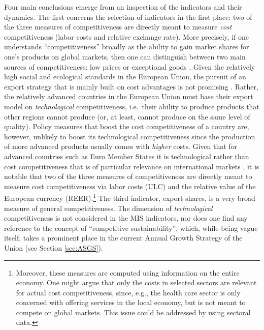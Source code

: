 \documentclass[
]{article}
\begin{document}
Four main conclusions emerge from an inspection of the indicators and their
dynamics.
The first concerns the selection of indicators in the first place:
two of the three measures of competitiveness are directly meant to measure
\emph{cost} competitiveness (labor costs and relative exchange rate).
More precisely, if one understands \enquote{competitiveness} broadly as the ability to
gain market shares for one's products on global markets,
then one can distinguish between two main sources of competitiveness:
low prices or exceptional goods
\citep[or, similarly, goods of exceptional quality, see][]{Sutton2012}.
Given the relatively high social and ecological standards in the European Union,
the pursuit of an export strategy that is mainly built on cost advantages is
not promising \citep[see also][]{Kapeller:2019cds}.
Rather, the relatively advanced countries in the European Union must base their
export model on \emph{technological} competitiveness, i.e.~their ability to produce
products that other regions cannot produce (or, at least, cannot produce on the
same level of quality).
Policy measures that boost the cost competitiveness of a country are, however,
unlikely to boost its technological competitiveness since the production of
more advanced products usually comes with \emph{higher} costs.
Given that for advanced countries such as Euro Member States it is
technological rather than cost competitiveness that is of particular relevance
on international markets \citep[e.g.][]{Carlin.2001, Storm.2015jsi, Dosi.2015},
it is notable that two of the three measures of competitiveness are directly
meant to measure cost competitiveness via labor costs (ULC) and the relative
value of the European currency (REER).\footnote{Moreover, these measures are computed using information on the entire
  economy. One might argue that only the costs in selected sectors are relevant
  for actual cost competitiveness, since, e.g., the health care sector is only
  concerned with offering services in the local economy, but is not meant to
  compete on global markets. This issue could be addressed by using sectoral
  data.}
The third indicator, export shares, is a very broad measure of general
competitiveness.
The dimension of \emph{technological} competitiveness is not considered in the MIS
indicators, nor does one find any reference to the concept of
\enquote{competitive sustainability}, which, while being vague itself, takes a
prominent place in the current Annual Growth Strategy of the Union (see Section
\ref{sec:ASGS}).
\end{document}
